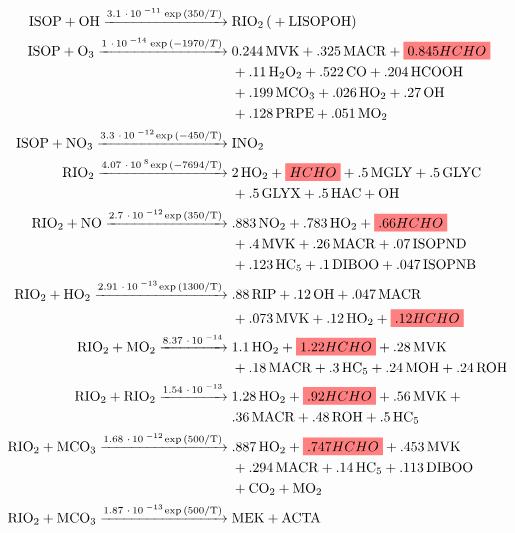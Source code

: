     \begin{subequations}
      \label{Model:GC:mechanisms:eqn_mechanisms}
      \begin{align} %
      \ce{
        ISOP + OH ->[3.1*10^{-11} \exp{(350/T})] 
        & RIO2 ( + LISOPOH) \label{mech1}  \\ 
        ISOP + O3 ->[1*10^{-14} \exp{(-1970/T})] 
        & 0.244MVK + .325MACR + \highlight{0.845HCHO} \notag \\
        & + .11H2O2 + .522CO + .204HCOOH \notag \\
        & + .199MCO3 +.026HO2 + .27OH \notag \\
        & + .128PRPE + .051MO2  \label{mech2} \\ 
        ISOP + NO3 ->[3.3*10^{-12} \exp{(-450/T)}] 
        & INO2 \label{mech3} \\
        RIO2 ->[4.07*10^{8} \exp{(-7694/T)}] 
        & 2HO2 + \highlight{HCHO} + .5MGLY + .5GLYC \notag \\
        & + .5GLYX + .5HAC + OH \label{mech4} \\
        RIO2 + NO ->[2.7*10^{-12} \exp{(350/T)}] 
        & .883NO2 + .783HO2 + \highlight{.66HCHO} \notag \\
        & + .4MVK + .26MACR + .07ISOPND \notag \\
        & + .123HC5 + .1DIBOO + .047ISOPNB \label{mech5} \\
        RIO2 + HO2 ->[2.91*10^{-13} \exp{(1300/T)}] 
        & .88RIP + .12OH + .047 MACR \notag \\
        & + .073MVK + .12HO2 + \highlight{.12HCHO} \label{mech6} \\
        RIO2 + MO2 ->[8.37*10^{-14}] 
        & 1.1HO2 + \highlight{1.22HCHO} + .28MVK  \notag\\
        & + .18MACR + .3HC5 + .24MOH + .24ROH \label{mech7} \\
        RIO2 + RIO2 ->[1.54*10^{-13}] 
        & 1.28HO2 + \highlight{.92HCHO} + .56MVK + \notag \\
        & .36MACR + .48ROH + .5HC5 \label{mech8} \\
        RIO2 + MCO3 ->[1.68*10^{-12} \exp{(500/T)}] 
        & .887HO2 + \highlight{.747HCHO} + .453MVK  \notag  \\
        & +.294MACR + .14HC5 + .113DIBOO  \notag  \\
        & + CO2 + MO2 \label{mech9}  \\
        RIO2 + MCO3 ->[1.87*10^{-13} \exp{(500/T)}] 
        & MEK + ACTA  \label{mech10} 
      }
      \end{align} \end{subequations} 
    

